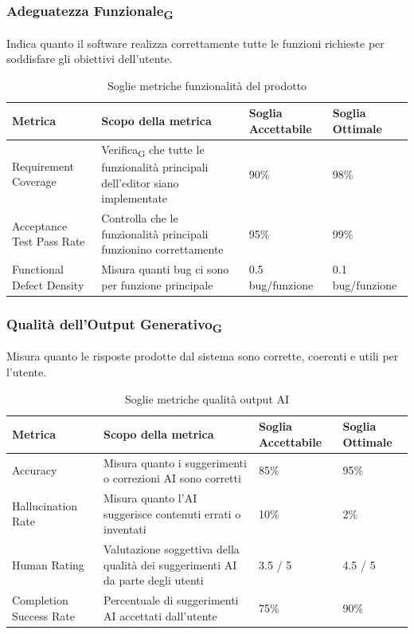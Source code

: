 \documentclass[11pt,a4paper]{article}
\newcommand{\gls}[1]{#1\textsubscript{G}}
\begin{document}
\subsubsection{\gls{Adeguatezza Funzionale}}
Indica quanto il software realizza correttamente tutte le funzioni richieste per soddisfare gli obiettivi dell’utente.
\begin{table}[H]
\centering
\renewcommand{\arraystretch}{1.5}
\begin{tabular}{|M{0.25\textwidth}|M{0.35\textwidth}|M{0.15\textwidth}|M{0.15\textwidth}|}
\hline
\textbf{Metrica} & \textbf{Scopo della metrica} & \textbf{Soglia Accettabile} & \textbf{Soglia Ottimale} \\
\hline
Requirement Coverage & \gls{Verifica} che tutte le funzionalità principali dell’editor siano implementate & 90\% & 98\% \\ \hline
Acceptance Test Pass Rate & Controlla che le funzionalità principali funzionino correttamente & 95\% & 99\% \\ \hline
Functional Defect Density & Misura quanti bug ci sono per funzione principale & 0.5 bug/funzione & 0.1 bug/funzione \\
\hline
\end{tabular}
\caption{Soglie metriche funzionalità del prodotto}
\end{table}

\subsubsection{\gls{Qualità dell'Output Generativo}}
Misura quanto le risposte prodotte dal sistema sono corrette, coerenti e utili per l’utente.
\begin{table}[H]
\centering
\renewcommand{\arraystretch}{1.5}
\begin{tabular}{|M{0.25\textwidth}|M{0.35\textwidth}|M{0.15\textwidth}|M{0.15\textwidth}|}
\hline
\textbf{Metrica} & \textbf{Scopo della metrica} & \textbf{Soglia Accettabile} & \textbf{Soglia Ottimale} \\
\hline
Accuracy & Misura quanto i suggerimenti o correzioni AI sono corretti & 85\% & 95\% \\ \hline
Hallucination Rate & Misura quanto l’AI suggerisce contenuti errati o inventati & 10\% & 2\% \\ \hline
Human Rating & Valutazione soggettiva della qualità dei suggerimenti AI da parte degli utenti & 3.5 / 5 & 4.5 / 5 \\ \hline
Completion Success Rate & Percentuale di suggerimenti AI accettati dall’utente & 75\% & 90\% \\
\hline
\end{tabular}
\caption{Soglie metriche qualità output AI}
\end{table}
\end{document}
